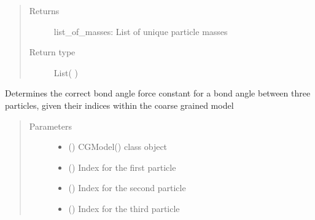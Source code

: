 \documentclass[letterpaper,12pt,english,openany,oneside]{sphinxmanual}
\begin{document}
\begin{fulllineitems}
\begin{fulllineitems}
\begin{quote}
\begin{description}
\item[{Returns}] \leavevmode
list\_of\_masses: List of unique particle masses

\item[{Return type}] \leavevmode

List(  )


\end{description}\end{quote}

\end{fulllineitems}


\begin{fulllineitems}
\label{\detokenize{cg_model:cg_model.cgmodel.CGModel.get_bond_angle_force_constant}}
Determines the correct bond angle force constant for a bond angle between three particles, given their indices within the coarse grained model
\begin{quote}\begin{description}
\item[{Parameters}] \leavevmode\begin{itemize}
\item {} 
 () \textendash{} CGModel() class object

\item {} 
 () \textendash{} Index for the first particle

\item {} 
 () \textendash{} Index for the second particle

\item {} 
 () \textendash{} Index for the third particle


\end{itemize}
\end{description}
\end{quote}
\end{fulllineitems}
\end{fulllineitems}
\end{document}
